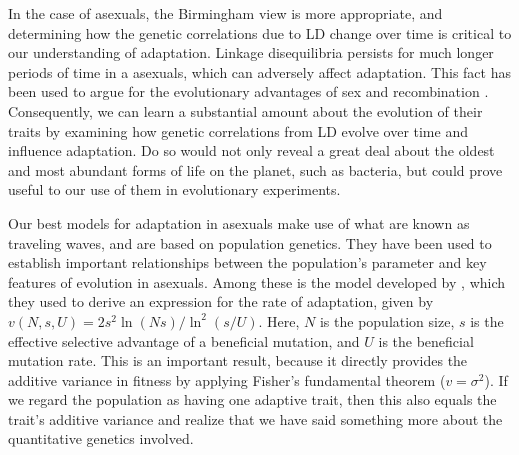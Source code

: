\documentclass[9pt,twocolumn,twoside]{gsajnl}
\begin{document}
In the case of asexuals, the Birmingham view is more appropriate, and determining how the genetic correlations due to LD change over time is critical to our understanding of adaptation. Linkage disequilibria persists for much longer periods of time in a asexuals, which can adversely affect adaptation. This fact has been used to argue for the evolutionary advantages of sex and recombination \citep{Barton2005,Otto2009}. Consequently, we can learn a substantial amount about the evolution of their traits by examining how genetic correlations from LD evolve over time and influence adaptation. Do so would not only reveal a great deal about the oldest and most abundant forms of life on the planet, such as bacteria, but could prove useful to our use of them in evolutionary experiments.\par

Our best models for adaptation in asexuals make use of what are known as traveling waves, and are based on population genetics. They have been used to establish important relationships between the population's parameter and key features of evolution in asexuals. Among these is the model developed by \cite{desai2007beneficial}, which they used to derive an expression for the rate of adaptation, given by $v(N,s,U) = 2s^2 \ln(N s)/\ln^2(s/U)$. Here, $N$ is the population size, $s$ is the effective selective advantage of a beneficial mutation, and $U$ is the beneficial mutation rate. This is an important result, because it directly provides the additive variance in fitness by applying Fisher's fundamental theorem ($v=\sigma^2$). If we regard the population as having one adaptive trait, then this also equals the trait's additive variance and realize that we have said something more about the quantitative genetics involved.\par
\end{document}
